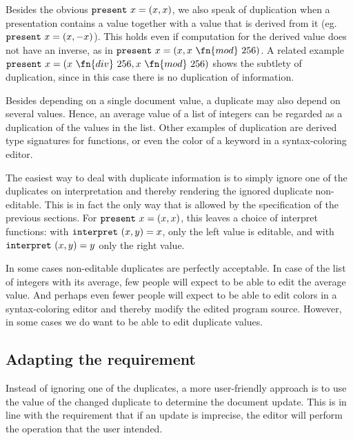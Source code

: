 Besides the obvious ${\tt present}~x = (x, x)$, we also speak of duplication when a presentation contains a value together with a value that is derived from it (eg. ${\tt present}~x = (x, -x)$). This holds even if computation for the derived value does not have an inverse, as in $\present~x = (x, x~\fn{mod}~256)$.  A related example $\present~x = (x~\fn{div}~256, x~\fn{mod}~256)$ shows the subtlety of duplication, since in this case there is no duplication of information. 

Besides depending on a single document value, a duplicate may also depend on several values. Hence, an average value of a list of integers can be regarded as a duplication of the values in the list. Other examples of duplication are derived type signatures for functions, or even the color of a keyword in a syntax-coloring editor.



The easiest way to deal with duplicate information is to simply ignore one of the duplicates on interpretation and thereby rendering the ignored duplicate non-editable. This is in fact the only way that is allowed by the specification of the previous sections. For ${\tt present}~x = (x,x)$, this leaves a choice of interpret functions: with ${\tt interpret}~(x,y) = x$, only the left value is editable, and with ${\tt interpret}~(x,y) = y$ only the right value.

In some cases non-editable duplicates are perfectly acceptable. In case of the list of integers with its average, few people will expect to be able to edit the average value. And perhaps even fewer people will expect to be able to edit colors in a syntax-coloring editor and thereby modify the edited program source. However, in some cases we do want to be able to edit duplicate values.

\subsection{Adapting the  requirement}
Instead of ignoring one of the duplicates, a more user-friendly approach is to use the value of the changed duplicate to determine the document update. This is in line with the requirement that if an update is imprecise, the editor will perform the operation that the user intended. 

